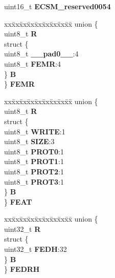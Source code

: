 \begin{DoxyCompactItemize}
\begin{tabbing}
\end{tabbing}\item 
\mbox{\label{structECSM__tag_aef41399fa40046b36ae3245e0c0d6583}} 
uint16\+\_\+t {\bfseries E\+C\+S\+M\+\_\+reserved0054}
\item 
\mbox{\label{structECSM__tag_af1206f3f1cc096eec6876ffef90cddce}} 
\begin{tabbing}
xx\=xx\=xx\=xx\=xx\=xx\=xx\=xx\=xx\=\kill
union \{\\
\>uint8\_t {\bfseries R}\\
\>struct \{\\
\>\>uint8\_t {\bfseries \_\_pad0\_\_}:4\\
\>\>uint8\_t {\bfseries FEMR}:4\\
\>\} {\bfseries B}\\
\} {\bfseries FEMR}\\

\end{tabbing}\item 
\mbox{\label{structECSM__tag_aa34a2227c5abe01500d63efb149cfa62}} 
\begin{tabbing}
xx\=xx\=xx\=xx\=xx\=xx\=xx\=xx\=xx\=\kill
union \{\\
\>uint8\_t {\bfseries R}\\
\>struct \{\\
\>\>uint8\_t {\bfseries WRITE}:1\\
\>\>uint8\_t {\bfseries SIZE}:3\\
\>\>uint8\_t {\bfseries PROT0}:1\\
\>\>uint8\_t {\bfseries PROT1}:1\\
\>\>uint8\_t {\bfseries PROT2}:1\\
\>\>uint8\_t {\bfseries PROT3}:1\\
\>\} {\bfseries B}\\
\} {\bfseries FEAT}\\

\end{tabbing}\item 
\mbox{\label{structECSM__tag_a2dfac73162a0b9acec02c7d66ed96640}} 
\begin{tabbing}
xx\=xx\=xx\=xx\=xx\=xx\=xx\=xx\=xx\=\kill
union \{\\
\>uint32\_t {\bfseries R}\\
\>struct \{\\
\>\>uint32\_t {\bfseries FEDH}:32\\
\>\} {\bfseries B}\\
\} {\bfseries FEDRH}\\


\end{tabbing}
\end{DoxyCompactItemize}
